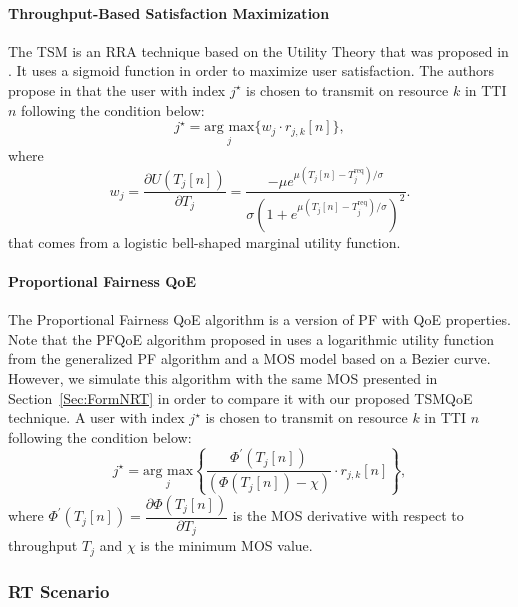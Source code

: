 \documentclass[conference]{IEEEtran}
\newcommand{\SecRef}[1]{Section~\ref{#1}}
\begin{document}
\paragraph{Throughput-Based Satisfaction Maximization\\}
The \ac{TSM} is an RRA technique based on the Utility Theory that was proposed in \cite{Rodrigues2014_Wiley}. It uses a sigmoid function in order to maximize user satisfaction. The authors propose in \cite{Rodrigues2014_Wiley} that the user with index $j^\star$ is chosen to transmit on resource $k$ in \ac{TTI} $n$ following the condition below:
%  
\begin{equation}
\label{Eq:TSMArgmax}
j^{\star} = \underset{j}{\text{arg max}}\Big\{w_j \cdot {r_{j, k}[n]}\Big \},
\end{equation}
%
where
%
\begin{equation}
\label{TSMMarginal}
w_{j} = \dfrac{\partial U\left(T_{j}[n]\right)}{\partial T_{j}} = \dfrac{- \mu  e^{\mu \left(T_{j}[n] - T_{j}^{\text{req}}\right) / \sigma}}{\sigma \left(1 + e^{\mu (T_{j}[n] - T_{j}^{\text{req}}) / \sigma}\right)^{2}}.
\end{equation}
%
that comes from a logistic bell-shaped marginal utility function.  

\paragraph{Proportional Fairness QoE\\}
The Proportional Fairness \ac{QoE} algorithm  is a version of \ac{PF} with \ac{QoE} properties. Note that the PFQoE algorithm proposed in \cite{cho2015qoe}  uses a logarithmic utility function from the generalized PF algorithm and a MOS model based on a Bezier curve. However, we simulate this algorithm with the same MOS presented in \SecRef{Sec:FormNRT} in order to compare it with our proposed TSMQoE technique. A user with index $j^\star$ is chosen to transmit on resource $k$ in \ac{TTI} $n$ following the condition below:
%
\begin{equation}
\label{Eq:PFQoEArgmax}
j^{\star} = \underset{j}{\text{arg max}} \left\{ {\dfrac{  \Phi^{'}\left(T_j[n]\right) }{\left(\Phi\left(T_j[n]\right) - \chi\right)} \cdot r_{j, k}[n]} \right\},
\end{equation}
%
where $\Phi^{'}\left(T_j[n]\right) = \dfrac{\partial\Phi\left(T_j[n]\right)}{\partial T_j}$ is the \ac{MOS} derivative  with respect to throughput $T_j$ and $\chi$ is the minimum MOS value.  
\subsubsection{\ac{RT} Scenario}
\end{document}
